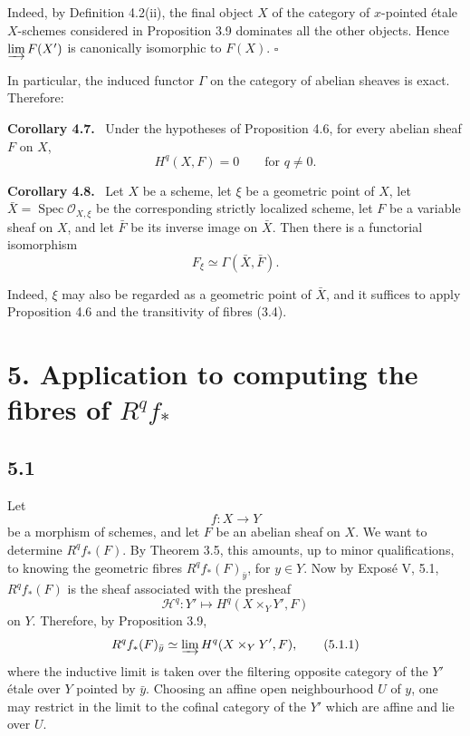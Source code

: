 \documentclass[11pt]{article}
\newcommand{\Hh}{\mathcal{H}}
\newcommand{\Oo}{\mathcal{O}}
\newcommand{\Spec}{\operatorname{Spec}}
\newcommand{\qedtext}{\hfill\(\square\)}
\newenvironment{statement}[1]{\par\medskip\noindent\textbf{#1.}\ }{\par\medskip}
\begin{document}
Indeed, by Definition 4.2(ii), the final object \(X\) of the category of \(x\)-pointed \'etale \(X\)-schemes considered in Proposition 3.9 dominates all the other objects. Hence \(\varinjlim F(X')\) is canonically isomorphic to \(F(X)\). \qedtext

In particular, the induced functor \(\Gamma\) on the category of abelian sheaves is exact. Therefore:

\begin{statement}{Corollary 4.7}
Under the hypotheses of Proposition 4.6, for every abelian sheaf \(F\) on \(X\),
\[
H^q(X,F)=0\qquad\text{for }q\ne 0.
\]
\end{statement}

\begin{statement}{Corollary 4.8}
Let \(X\) be a scheme, let \(\xi\) be a geometric point of \(X\), let \(\bar X=\Spec\Oo_{X,\xi}\) be the corresponding strictly localized scheme, let \(F\) be a variable sheaf on \(X\), and let \(\bar F\) be its inverse image on \(\bar X\). Then there is a functorial isomorphism
\[
F_\xi\simeq \Gamma(\bar X,\bar F).
\]
\end{statement}

Indeed, \(\xi\) may also be regarded as a geometric point of \(\bar X\), and it suffices to apply Proposition 4.6 and the transitivity of fibres (3.4).

\section*{5. Application to computing the fibres of \(R^qf_*\)}

\subsection*{5.1}
Let
\[
f:X\to Y
\]
be a morphism of schemes, and let \(F\) be an abelian sheaf on \(X\). We want to determine \(R^qf_*(F)\). By Theorem 3.5, this amounts, up to minor qualifications, to knowing the geometric fibres \(R^qf_*(F)_{\bar y}\), for \(y\in Y\). Now by Expos\'e V, 5.1, \(R^qf_*(F)\) is the sheaf associated with the presheaf
\[
\Hh^q:Y'\longmapsto H^q(X\times_YY',F)
\]
on \(Y\). Therefore, by Proposition 3.9,
\[
R^qf_*(F)_{\bar y}\simeq \varinjlim H^q(X\times_YY',F),
\tag{5.1.1}
\]
where the inductive limit is taken over the filtering opposite category of the \(Y'\) \'etale over \(Y\) pointed by \(\bar y\). Choosing an affine open neighbourhood \(U\) of \(y\), one may restrict in the limit to the cofinal category of the \(Y'\) which are affine and lie over \(U\).
\end{document}
